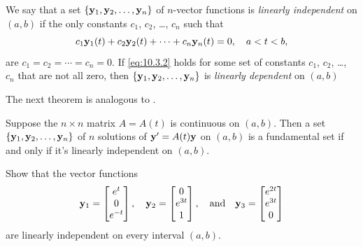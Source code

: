 We say that a set $\{\mathbf{y}_1,\mathbf{y}_2,\dots,\mathbf{y}_n\}$ of
$n$-vector functions is
\emph{\color{blue}linearly independent}
on $(a,b)$ if the
only constants $c_1$, $c_2$, \dots, $c_n$ such that
\begin{equation} \label{eq:10.3.2}
 c_1\mathbf{y}_1(t)+c_2\mathbf{y}_2(t)+\cdots+c_n\mathbf{y}_n(t)=0,\quad
a<t<b,
\end{equation}
are $c_1=c_2=\cdots=c_n=0$. If \eqref{eq:10.3.2} holds for some set of
constants $c_1$, $c_2$, \dots, $c_n$ that are not all zero, then $\{\mathbf{y}_1,\mathbf{y}_2,\dots,\mathbf{y}_n\}$ is \emph{\color{blue}linearly dependent} on
$(a,b)$

The next theorem is analogous to
.

\begin{theorem}\label{thmtype:10.3.1}
Suppose the $n\times n$ matrix $A=A(t)$ is continuous on $(a,b)$.
Then a set
$\{\mathbf{y}_1,\mathbf{y}_2,\dots,\mathbf{y}_n\}$ of $n$ solutions of $\mathbf{y}'=A(t)\mathbf{y}$ on $(a,b)$ is a fundamental set if and only if it's
linearly independent on $(a,b)$.
\end{theorem}

\begin{example}\label{example:10.3.1}
Show that the vector functions
\[
\mathbf{y}_1=\begin{bmatrix}e^t\\0\\e^{-t}\end{bmatrix},\quad
\mathbf{y}_2=\begin{bmatrix}0\\e^{3t}\\1\end{bmatrix},
\quad\text{and}\quad
\mathbf{y}_3=\begin{bmatrix}e^{2t}\\e^{3t}\\0\end{bmatrix}
\]
are linearly independent on every interval  $(a,b)$.
\end{example}

